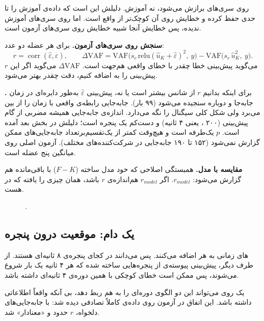  روی سری‌های  برازش می‌شود، نه آموزش. دلیلش این است که  داده‌ی آموزش را تا حدی حفظ کرده و خطایش روی آن کوچک‌تر از واقع است. اما  روی سری‌های  آموزش ندیده، پس خطایش آنجا شبیه خطایش روی سری‌های آزمون است.

\textbf{سنجش روی سری‌های آزمون.} برای هر عضله دو عدد:
\begin{equation}
r=\operatorname{corr}(\hat\varepsilon,\varepsilon),\qquad
\Delta\mathrm{VAF}=\mathrm{VAF}\big(s_c\,\mathrm{relu}(\hat u_K+\hat\varepsilon)^2,\ y\big)-\mathrm{VAF}\big(s_c\,\hat u_K^{2},\ y\big).
\end{equation}
$r$ می‌گوید پیش‌بینی خطا چقدر با خطای واقعی هم‌جهت است. $\Delta\mathrm{VAF}$ می‌گوید اگر این پیش‌بینی را به  اضافه کنیم، دقت چقدر بهتر می‌شود.

\textbf{.} برای اینکه بدانیم $r$ از شانس بیشتر است یا نه، پیش‌بینی $\hat\varepsilon$ به‌طور دایره‌ای در زمان جابه‌جا و دوباره سنجیده می‌شود (۹۹ بار). جابه‌جایی رابطه‌ی واقعی با زمان را از بین می‌برد ولی شکل کلی سیگنال را نگه می‌دارد. اندازه‌ی جابه‌جایی همیشه مضربی از گام پیش‌بینی (۲۰۰ ، یعنی ۴ ثانیه) و دست‌کم یک پنجره است؛ دلیلش در بخش بعد آمده است. $p$ یک‌طرفه است و هیچ‌وقت کمتر از یک‌تقسیم‌بر‌تعداد جابه‌جایی‌های ممکن گزارش نمی‌شود (۱۵۲ تا ۱۹۰ جابه‌جایی در شرکت‌کننده‌های مختلف). آزمون اصلی روی میانگین پنج عضله است.

\textbf{مقایسه با مدل.} همبستگی اصلاحی که خود مدل ساخته ($F-K$) با باقی‌مانده هم گزارش می‌شود: $r_{model}$. اگر $r_{model}$ هم‌اندازه‌ی $r$  باشد،  همان چیزی را یافته که در  هست.

\begin{figure}[htbp]
\centering

\caption{.}
\label{fig:residual}
\end{figure}

\subsection{یک دام: موقعیت درون پنجره}

های زمانی به هر   اضافه می‌کنند. پس   می‌دانند در کجای پنجره‌ی ۸ ثانیه‌ای هستند. از طرف دیگر، پیش‌بینی پیوسته‌ی  از پنجره‌هایی ساخته شده که هر ۴ ثانیه یک بار شروع می‌شوند، پس ممکن است خطای کوچکی با همین دوره‌ی ۴ ثانیه‌ای داشته باشد.

یک  روی  می‌تواند این دو الگوی دوره‌ای را به هم ربط دهد، بی آنکه  واقعاً اطلاعاتی داشته باشد. این اتفاق در آزمون روی داده‌ی کاملاً تصادفی دیده شد: با جابه‌جایی‌های دلخواه، $r$ حدود  و «معنادار» شد.


